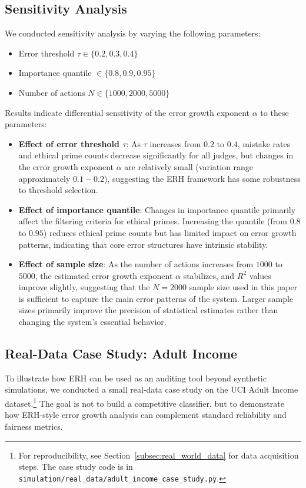 \documentclass[12pt,a4paper]{article}
\theoremstyle{definition}
\theoremstyle{remark}
\begin{document}
\subsection{Sensitivity Analysis}

We conducted sensitivity analysis by varying the following parameters:
\begin{itemize}
    \item Error threshold $\tau \in \{0.2, 0.3, 0.4\}$
    \item Importance quantile $\in \{0.8, 0.9, 0.95\}$
    \item Number of actions $N \in \{1000, 2000, 5000\}$
\end{itemize}

Results indicate differential sensitivity of the error growth exponent $\alpha$ to these parameters:
\begin{itemize}
    \item \textbf{Effect of error threshold $\tau$}: As $\tau$ increases from $0.2$ to $0.4$, mistake rates and ethical prime counts decrease significantly for all judges, but changes in the error growth exponent $\alpha$ are relatively small (variation range approximately $0.1-0.2$), suggesting the ERH framework has some robustness to threshold selection.
    \item \textbf{Effect of importance quantile}: Changes in importance quantile primarily affect the filtering criteria for ethical primes. Increasing the quantile (from $0.8$ to $0.95$) reduces ethical prime counts but has limited impact on error growth patterns, indicating that core error structures have intrinsic stability.
    \item \textbf{Effect of sample size}: As the number of actions increases from $1000$ to $5000$, the estimated error growth exponent $\alpha$ stabilizes, and $R^2$ values improve slightly, suggesting that the $N=2000$ sample size used in this paper is sufficient to capture the main error patterns of the system. Larger sample sizes primarily improve the precision of statistical estimates rather than changing the system's essential behavior.
\end{itemize}

\subsection{Real-Data Case Study: Adult Income}
\label{subsec:real_data}

To illustrate how ERH can be used as an auditing tool beyond synthetic simulations, we conducted a small real-data case study on the UCI Adult Income dataset.\footnote{For reproducibility, see Section~\ref{subsec:real_world_data} for data acquisition steps. The case study code is in \texttt{simulation/real\_data/adult\_income\_case\_study.py}.}
The goal is not to build a competitive classifier, but to demonstrate how ERH-style error growth analysis can complement standard reliability and fairness metrics.
\end{document}

